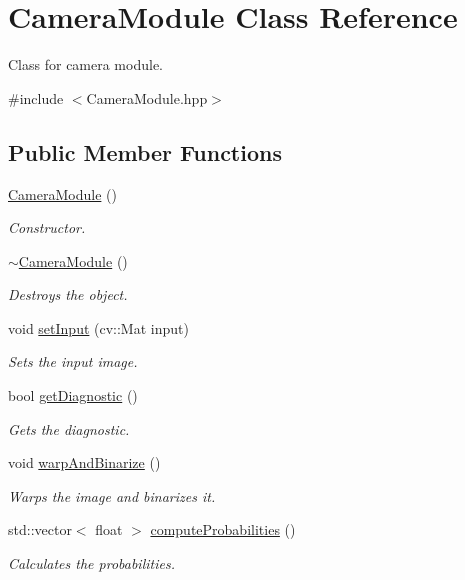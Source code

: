 \hypertarget{class_camera_module}{}\section{Camera\+Module Class Reference}
\label{class_camera_module}


Class for camera module.  




{\ttfamily \#include $<$Camera\+Module.\+hpp$>$}

\subsection*{Public Member Functions}
\begin{DoxyCompactItemize}
\item 
\hyperlink{class_camera_module_aee54ebbc4116cf63c1e9a95987d779a0}{Camera\+Module} ()
\begin{DoxyCompactList}\small\item\em Constructor. \end{DoxyCompactList}\item 
\hyperlink{class_camera_module_a04bd90027432f057e9b12d1c601c8fcb}{$\sim$\+Camera\+Module} ()
\begin{DoxyCompactList}\small\item\em Destroys the object. \end{DoxyCompactList}\item 
void \hyperlink{class_camera_module_abaf1518284d63d4e30d25e86d116856f}{set\+Input} (cv\+::\+Mat input)
\begin{DoxyCompactList}\small\item\em Sets the input image. \end{DoxyCompactList}\item 
bool \hyperlink{class_camera_module_aa160cacc20eb07d54e1130234f339a46}{get\+Diagnostic} ()
\begin{DoxyCompactList}\small\item\em Gets the diagnostic. \end{DoxyCompactList}\item 
void \hyperlink{class_camera_module_a1b442eae9cbc3101ed73d5dffbeb49f3}{warp\+And\+Binarize} ()
\begin{DoxyCompactList}\small\item\em Warps the image and binarizes it. \end{DoxyCompactList}\item 
std\+::vector$<$ float $>$ \hyperlink{class_camera_module_adefaf0a7a6f6d78cc6d8ff0d15ff77f4}{compute\+Probabilities} ()
\begin{DoxyCompactList}\small\item\em Calculates the probabilities. \end{DoxyCompactList}\end{DoxyCompactItemize}


